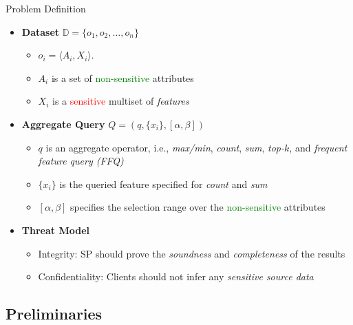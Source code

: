 \documentclass[xcolor={dvipsnames},aspectratio=169,10pt]{beamer}
\begin{document}
\begin{frame}{Problem Definition}
  \begin{itemize}[<+->]
    \item \textbf{Dataset} $\mathbb{D} = \{o_1, o_2, \dotsc, o_n\}$
      \begin{itemize}[<.->]
        \item $o_i = \langle A_i, X_i \rangle$.
        \item $A_i$ is a set of \textcolor{Green}{non-sensitive} attributes
        \item $X_i$ is a \textcolor{Red}{sensitive} multiset of \emph{features}
      \end{itemize}
    \item \textbf{Aggregate Query} $Q = (q, \{x_i\}, [\alpha, \beta])$
      \begin{itemize}[<.->]
        \item $q$ is an aggregate operator, i.e., \emph{max/min}, \emph{count}, \emph{sum}, \emph{top-$k$}, and \emph{frequent feature query (FFQ)}
        \item $\{x_i\}$ is the queried feature specified for \emph{count} and \emph{sum}
        \item $[\alpha, \beta]$ specifies the selection range over the \textcolor{Green}{non-sensitive} attributes
      \end{itemize}
    \item \textbf{Threat Model}
      \begin{itemize}[<.->]
        \item \alert{Integrity}: SP should prove the \emph{soundness} and \emph{completeness} of the results
        \item \alert{Confidentiality}: Clients should not infer any \emph{sensitive source data}
      \end{itemize}
  \end{itemize}
\end{frame}

\subsection{Preliminaries}
\end{document}
